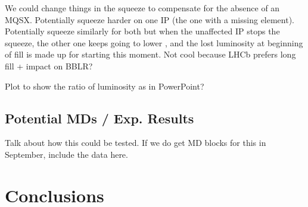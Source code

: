We could change things in the squeeze to compensate for the absence of an MQSX.
Potentially squeeze harder on one IP (the one with a missing element).
Potentially squeeze similarly for both but when the unaffected IP stops the squeeze, the other one keeps going to lower \betastar, and the lost luminosity at beginning of fill is made up for starting this moment.
Not cool because LHCb prefers long fill + impact on BBLR?

Plot to show the ratio of luminosity as in PowerPoint?

\subsection{Potential MDs / Exp. Results}

Talk about how this could be tested.
If we do get MD blocks for this in September, include the data here.


\section{Conclusions}

